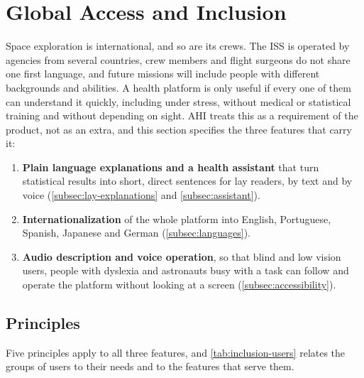 \section{Global Access and Inclusion}
\label{sec:global-access}

Space exploration is international, and so are its crews. The ISS is operated by agencies from several countries, crew members and flight surgeons do not share one first language, and future missions will include people with different backgrounds and abilities. A health platform is only useful if every one of them can understand it quickly, including under stress, without medical or statistical training and without depending on sight. AHI treats this as a requirement of the product, not as an extra, and this section specifies the three features that carry it:

\begin{enumerate}
\item \textbf{Plain language explanations and a health assistant} that turn statistical results into short, direct sentences for lay readers, by text and by voice (\ref{subsec:lay-explanations} and \ref{subsec:assistant}).
\item \textbf{Internationalization} of the whole platform into English, Portuguese, Spanish, Japanese and German (\ref{subsec:languages}).
\item \textbf{Audio description and voice operation}, so that blind and low vision users, people with dyslexia and astronauts busy with a task can follow and operate the platform without looking at a screen (\ref{subsec:accessibility}).
\end{enumerate}

\subsection{Principles}
\label{subsec:global-principles}

Five principles apply to all three features, and \ref{tab:inclusion-users} relates the groups of users to their needs and to the features that serve them.


